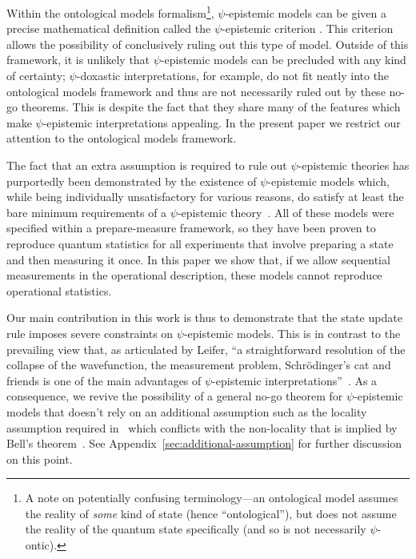 \documentclass[%
 reprint,
superscriptaddress,
nofootinbib,
 amsmath,amssymb,
 prx, 
 accepted=2019-09-27,
]{quantumarticle}
\begin{document}
 
Within the ontological models formalism\footnote{A note on potentially
  confusing terminology---an ontological model assumes the reality of
  \emph{some} kind of state (hence ``ontological''), but does not
  assume the reality of the quantum state specifically (and so is not
  necessarily $\psi$-ontic).}, $\psi$-epistemic models can be given a
precise mathematical definition called the $\psi$-epistemic criterion
\cite{Spekkensdefenseepistemicview2007}. This criterion allows the
possibility of conclusively ruling out this type of model. Outside of
this framework, it is unlikely that $\psi$-epistemic models can be
precluded with any kind of certainty; $\psi$-doxastic interpretations,
for example, do not fit neatly into the ontological models framework
and thus are not necessarily ruled out by these no-go theorems. This
is despite the fact that they share many of the features which make
$\psi$-epistemic interpretations appealing. In the present paper we
restrict our attention to the ontological models framework.


 
The fact that an extra assumption is required to rule out
$\psi$-epistemic theories has purportedly been demonstrated by the
existence of $\psi$-epistemic models which, while being individually
unsatisfactory for various reasons, do satisfy at least the bare
minimum requirements of a $\psi$-epistemic
theory~\cite{LewisDistinctQuantumStates2012,Aaronsonpsepistemictheoriesrole2013,HarriganRepresentingprobabilisticdata2007}. All
of these models were specified within a prepare-measure framework, so
they have been proven to reproduce quantum statistics for all
experiments that involve preparing a state and then measuring it
once. In this paper we show that, if we allow sequential measurements
in the operational description, these models cannot reproduce
operational statistics.

Our main contribution in this work is thus to demonstrate that the
state update rule imposes severe constraints on $\psi$-epistemic
models. This is in contrast to the prevailing view that, as
articulated by Leifer, ``a straightforward resolution of the collapse
of the wavefunction, the measurement problem, Schr\"odinger’s cat and
friends is one of the main advantages of $\psi$-epistemic
interpretations''~\cite{Leiferquantumstatereal2014}. As a consequence,
we revive the possibility of a general no-go theorem for
$\psi$-epistemic models that doesn't rely on an additional assumption
such as the locality assumption required
in~\cite{Puseyrealityquantumstate2012} which conflicts with the
non-locality that is implied by Bell's
theorem~\cite{Emersonwholegreatersum2013,MansfieldRealityquantumstate2016}. See
Appendix~\ref{sec:additional-assumption} for further discussion on
this point.
\end{document}
